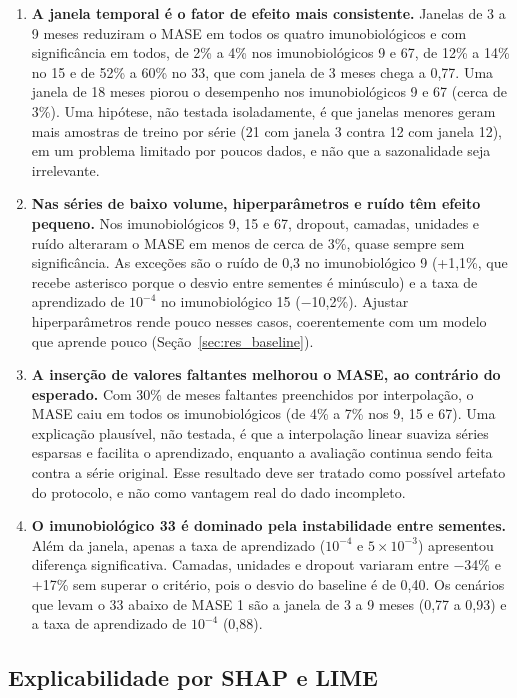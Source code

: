 \documentclass[
    12pt,
    openright,
    oneside,
    a4paper,
    english,
    brazil
]{abntex2}
\begin{document}
\begin{enumerate}
    \item \textbf{A janela temporal é o fator de efeito mais consistente.} Janelas de 3 a 9 meses reduziram o MASE em todos os quatro imunobiológicos e com significância em todos, de 2\% a 4\% nos imunobiológicos 9 e 67, de 12\% a 14\% no 15 e de 52\% a 60\% no 33, que com janela de 3 meses chega a 0,77. Uma janela de 18 meses piorou o desempenho nos imunobiológicos 9 e 67 (cerca de 3\%). Uma hipótese, não testada isoladamente, é que janelas menores geram mais amostras de treino por série (21 com janela 3 contra 12 com janela 12), em um problema limitado por poucos dados, e não que a sazonalidade seja irrelevante.
    \item \textbf{Nas séries de baixo volume, hiperparâmetros e ruído têm efeito pequeno.} Nos imunobiológicos 9, 15 e 67, dropout, camadas, unidades e ruído alteraram o MASE em menos de cerca de 3\%, quase sempre sem significância. As exceções são o ruído de 0,3 no imunobiológico 9 (+1,1\%, que recebe asterisco porque o desvio entre sementes é minúsculo) e a taxa de aprendizado de $10^{-4}$ no imunobiológico 15 ($-$10,2\%). Ajustar hiperparâmetros rende pouco nesses casos, coerentemente com um modelo que aprende pouco (Seção~\ref{sec:res_baseline}).
    \item \textbf{A inserção de valores faltantes melhorou o MASE, ao contrário do esperado.} Com 30\% de meses faltantes preenchidos por interpolação, o MASE caiu em todos os imunobiológicos (de 4\% a 7\% nos 9, 15 e 67). Uma explicação plausível, não testada, é que a interpolação linear suaviza séries esparsas e facilita o aprendizado, enquanto a avaliação continua sendo feita contra a série original. Esse resultado deve ser tratado como possível artefato do protocolo, e não como vantagem real do dado incompleto.
    \item \textbf{O imunobiológico 33 é dominado pela instabilidade entre sementes.} Além da janela, apenas a taxa de aprendizado ($10^{-4}$ e $5\times10^{-3}$) apresentou diferença significativa. Camadas, unidades e dropout variaram entre $-$34\% e +17\% sem superar o critério, pois o desvio do baseline é de 0,40. Os cenários que levam o 33 abaixo de MASE 1 são a janela de 3 a 9 meses (0,77 a 0,93) e a taxa de aprendizado de $10^{-4}$ (0,88).
\end{enumerate}

\subsection{Explicabilidade por SHAP e LIME}
\label{sec:res_explicabilidade}
\end{document}
